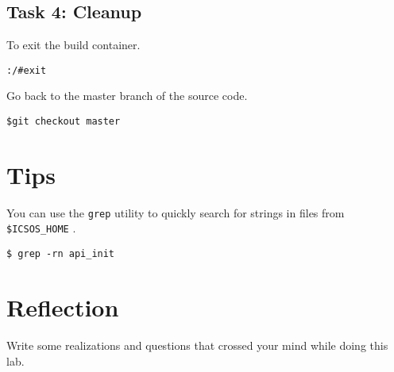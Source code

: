 \documentclass[a4paper, 11pt,oneside]{article}
\begin{document}
\subsection*{Task 4: Cleanup}
To exit the build container. 
\begin{verbatim}
:/#exit
\end{verbatim}

Go back to the master branch of the source code.
\begin{verbatim}
$git checkout master
\end{verbatim}



\section{Tips}
You can use the \texttt{grep} utility to quickly search for strings in files from \texttt{\$ICSOS\_HOME} .
\begin{verbatim}
$ grep -rn api_init
\end{verbatim}
 
\section{Reflection}
Write some realizations and questions that crossed your mind while doing this 
lab. 
\end{document}

